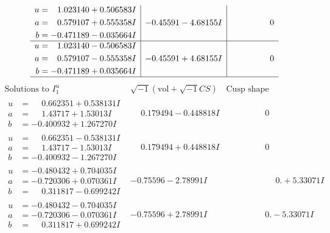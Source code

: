\documentclass[1p]{elsarticle_modified}
\theoremstyle{definition}
\newcommand{\I}{\sqrt{-1}}
\begin{document}
$$\begin{array}{c|c|c}
\begin{aligned}
u &= \phantom{-}1.023140 + 0.506583 I \\
a &= \phantom{-}0.579107 + 0.555358 I \\
b &= -0.471189 - 0.035664 I\end{aligned}
 & -0.45591 - 4.68155 I & \phantom{-0.000000 } 0 \\ \hline\begin{aligned}
u &= \phantom{-}1.023140 - 0.506583 I \\
a &= \phantom{-}0.579107 - 0.555358 I \\
b &= -0.471189 + 0.035664 I\end{aligned}
 & -0.45591 + 4.68155 I & \phantom{-0.000000 } 0\\
 \hline 
 \end{array}$$\newpage$$\begin{array}{c|c|c}  
\text{Solutions to }I^u_{1}& \I (\text{vol} + \sqrt{-1}CS) & \text{Cusp shape}\\
 \hline 
\begin{aligned}
u &= \phantom{-}0.662351 + 0.538131 I \\
a &= \phantom{-}1.43717 + 1.53013 I \\
b &= -0.400932 + 1.267270 I\end{aligned}
 & \phantom{-}0.179494 - 0.448818 I & \phantom{-0.000000 } 0 \\ \hline\begin{aligned}
u &= \phantom{-}0.662351 - 0.538131 I \\
a &= \phantom{-}1.43717 - 1.53013 I \\
b &= -0.400932 - 1.267270 I\end{aligned}
 & \phantom{-}0.179494 + 0.448818 I & \phantom{-0.000000 } 0 \\ \hline\begin{aligned}
u &= -0.480432 + 0.704035 I \\
a &= -0.720306 + 0.070361 I \\
b &= \phantom{-}0.311817 - 0.699242 I\end{aligned}
 & -0.75596 - 2.78991 I & \phantom{-0.000000 -}0. + 5.33071 I \\ \hline\begin{aligned}
u &= -0.480432 - 0.704035 I \\
a &= -0.720306 - 0.070361 I \\
b &= \phantom{-}0.311817 + 0.699242 I\end{aligned}
 & -0.75596 + 2.78991 I & \phantom{-0.000000 } 0. - 5.33071 I \\ \hline\begin{aligned}

\end{aligned}
\end{array}$$
\end{document}

